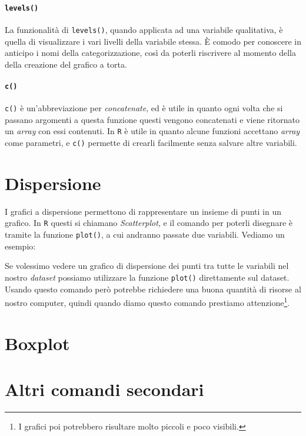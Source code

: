 \paragraph*{\texttt{levels()}} La funzionalità di \texttt{levels()}, quando
applicata ad una variabile qualitativa, è quella di visualizzare i vari livelli
della variabile stessa. È comodo per conoscere in anticipo i nomi della
categorizzazione, così da poterli riscrivere al momento della della creazione
del grafico a torta.

\paragraph*{\texttt{c()}} \texttt{c()} è un'abbreviazione per
\textit{concatenate}, ed è utile in quanto ogni volta che si passano argomenti
a questa funzione questi vengono concatenati e viene ritornato un
\textit{array} con essi contenuti. In \texttt{R} è utile in quanto alcune
funzioni accettano \textit{array} come parametri, e \texttt{c()} permette di
crearli facilmente senza salvare altre variabili.

\section{Dispersione}

I grafici a dispersione permettono di rappresentare un insieme di punti in un
grafico. In \texttt{R} questi si chiamano \textit{Scatterplot}, e il comando
per poterli disegnare è tramite la funzione \texttt{plot()}, a cui andranno
passate due variabili. Vediamo un esempio:



Se volessimo vedere un grafico di dispersione dei punti tra tutte le variabili
nel nostro \textit{dataset} possiamo utilizzare la funzione \texttt{plot()}
direttamente sul dataset. Usando questo comando però potrebbe richiedere una
buona quantità di risorse al nostro computer, quindi quando diamo questo
comando prestiamo attenzione\footnote{I grafici poi potrebbero risultare molto
piccoli e poco visibili.}.

\section{Boxplot}



\section{Altri comandi secondari}

